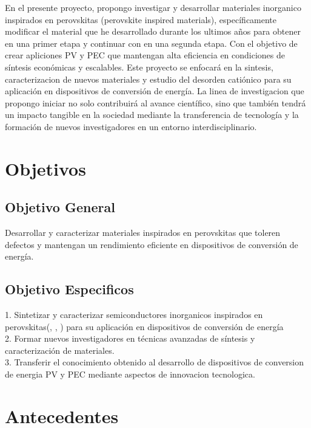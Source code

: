 \documentclass[12pt,letter,spanish]{article}
\begin{document}
En el presente proyecto, propongo investigar y desarrollar materiales inorganico inspirados en perovskitas (perovskite inspired materials), específicamente modificar el material que he desarrollado durante los ultimos años  para obtener  en una primer etapa y  continuar con  en una segunda etapa. Con el objetivo de crear apliciones PV y PEC que mantengan alta eficiencia en condiciones de síntesis económicas y escalables. Este proyecto se enfocará en la sintesis, caracterizacion de nuevos materiales y estudio del desorden catiónico para su aplicación en dispositivos de conversión de energía. La linea de investigacion que propongo iniciar no solo contribuirá al avance científico, sino que también tendrá un impacto tangible en la sociedad mediante la transferencia de tecnología y la formación de nuevos investigadores en un entorno interdisciplinario.

\section*{Objetivos}

\subsection*{Objetivo General}
Desarrollar y caracterizar materiales inspirados en perovskitas que toleren defectos y mantengan un rendimiento eficiente en dispositivos de conversión de energía.
\subsection*{Objetivo Especificos}
	
	1.	Sintetizar y caracterizar semiconductores inorganicos inspirados en perovskitas(, , ) para su aplicación en dispositivos de conversión de energía \\
	2.	Formar nuevos investigadores en técnicas avanzadas de síntesis y caracterización de materiales. \\
	3.	Transferir el conocimiento obtenido al desarrollo de dispositivos de conversion de energia PV y PEC mediante aspectos de innovacion tecnologica.

\section*{Antecedentes}
\end{document}
